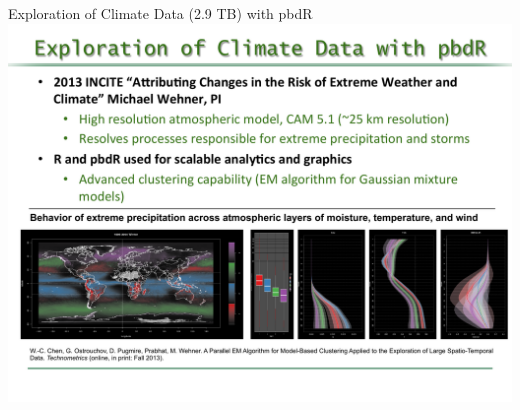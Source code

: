 \begin{frame}
  \begin{block}{\scriptsize Exploration of Climate Data (2.9 TB) with pbdR} 
    \includegraphics[width=\textwidth,trim=0ex 9ex 0ex 13ex,clip]{../common/pics/apps/ClimateApp.pdf}
  \end{block}
\end{frame}

